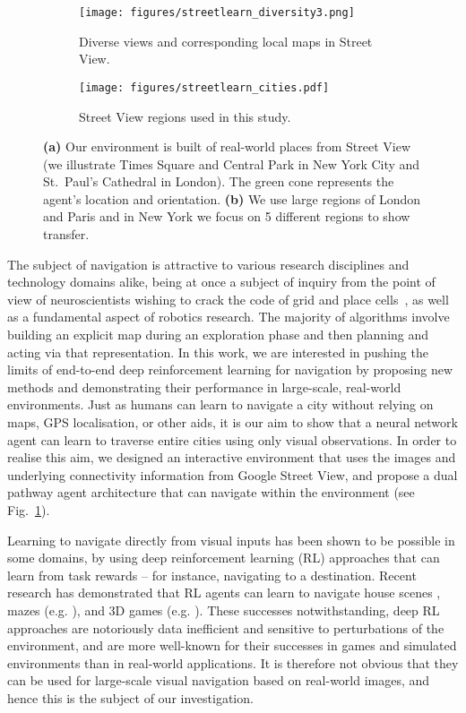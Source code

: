\begin{figure}[h]
\begin{subfigure}{.58\textwidth}
  \centering
  \texttt{[image: figures/streetlearn\_diversity3.png]}
  \caption{Diverse views and corresponding local maps in Street View.}
  \label{fig:streetview}
\end{subfigure}%
\begin{subfigure}{.42\textwidth}
  \centering
  \texttt{[image: figures/streetlearn\_cities.pdf]}
  \caption{Street View regions used in this study.}
  \label{fig:nyc}
\end{subfigure}
\caption{\textbf{(a)} Our environment is built of real-world places from Street View (we illustrate Times Square and Central Park in New York City and St.\ Paul's Cathedral in London). The green cone represents the agent's location and orientation. \textbf{(b)} We use large regions of London and Paris and in New York we focus on 5 different regions to show transfer.}
\vskip -0.2in
\end{figure}

The subject of navigation is attractive to
various research disciplines and technology domains alike, being at once a subject of inquiry from the point of view of neuroscientists wishing to crack the code of grid and place cells~\cite{banino2018vector,cueva2018emergence}, as well as a fundamental aspect of robotics research. The majority of algorithms involve building an explicit map during an exploration phase and then planning and acting via that representation. 
In this work, we are interested in pushing the limits of end-to-end deep reinforcement learning for navigation by proposing new methods and demonstrating their performance in large-scale, real-world environments. Just as humans can learn to navigate a city without relying on maps, GPS localisation, or other aids, it is our aim to show that a neural network agent can learn to traverse entire cities using only visual observations. In order to realise this aim, we designed an interactive environment that uses the images and underlying connectivity information from Google Street View, and propose a dual pathway agent architecture that can navigate within the environment (see Fig.~\ref{fig:streetview}).

Learning to navigate directly from visual inputs has been shown to be possible in some domains, by using deep reinforcement learning (RL) approaches that can learn from task rewards -- for instance, navigating to a destination. Recent research has demonstrated that RL agents can learn to navigate house scenes \cite{zhu_icra2017, wu2018building}, mazes  (e.g. \cite{mirowski2016learning}), and 3D games (e.g. \cite{lample_aaai17}). These successes notwithstanding, deep RL approaches are notoriously data inefficient and sensitive to perturbations of the environment, and are more well-known for their successes in games and simulated environments than in real-world applications. It is therefore not obvious that they can be used for large-scale visual navigation based on real-world images, and hence this is the subject of our investigation.


